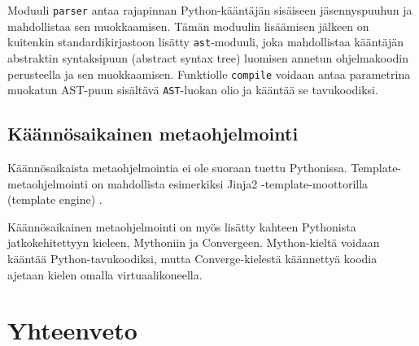 \documentclass[finnish]{tktltiki2}
\theoremstyle{definition}
\theoremstyle{remark}
\begin{document}
Moduuli \verb|parser| antaa rajapinnan Python-kääntäjän sisäiseen jäsennyspuuhun ja mahdollistaa sen muokkaamisen. Tämän moduulin lisäämisen jälkeen on kuitenkin standardikirjastoon lisätty \verb|ast|-moduuli, joka mahdollistaa kääntäjän abstraktin syntaksipuun (abstract syntax tree) luomisen annetun ohjelmakoodin perusteella ja sen muokkaamisen. Funktiolle \verb|compile| voidaan antaa parametrina muokatun AST-puun sisältävä \verb|AST|-luokan olio ja kääntää se tavukoodiksi.





\subsection{Käännösaikainen metaohjelmointi}

Käännösaikaista metaohjelmointia ei ole suoraan tuettu Pythonissa. Template-metaohjelmointi on mahdollista esimerkiksi Jinja2 -template-moottorilla (template engine) \cite{jinja}.

Käännösaikainen metaohjelmointi on myös lisätty kahteen Pythonista jatkokehitettyyn kieleen, Mythoniin\cite{mython} ja Convergeen\cite{tratt05}. Mython-kieltä voidaan kääntää Python-tavukoodiksi, mutta Converge-kielestä käännettyä koodia ajetaan kielen omalla virtuaalikoneella.


\section{Yhteenveto}



\pagebreak

%
%
% 
%




\lastpage
\end{document}
